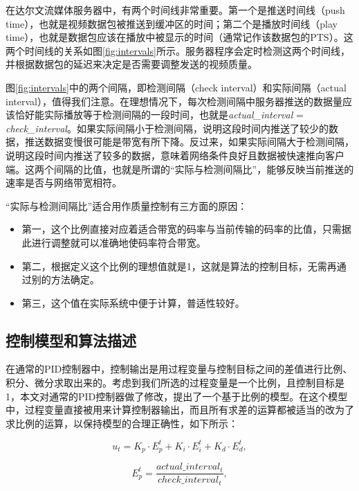 在达尔文流媒体服务器中，有两个时间线非常重要。第一个是推送时间线（push time），也就是视频数据包被推送到缓冲区的时间；第二个是播放时间线（play time），也就是数据包应该在播放中被显示的时间（通常记作该数据包的PTS）。这两个时间线的关系如图\ref{fig:intervals}所示。服务器程序会定时检测这两个时间线，并根据数据包的延迟来决定是否需要调整发送的视频质量。

图\ref{fig:intervals}中的两个间隔，即检测间隔（check interval）和实际间隔（actual interval），值得我们注意。在理想情况下，每次检测间隔中服务器推送的数据量应该恰好能实际播放等于检测间隔的一段时间，也就是\textit{actual\_interval} = \textit{check\_interval}。如果实际间隔小于检测间隔，说明这段时间内推送了较少的数据，推送数据变慢很可能是带宽有所下降。反过来，如果实际间隔大于检测间隔，说明这段时间内推送了较多的数据，意味着网络条件良好且数据被快速推向客户端。这两个间隔的比值，也就是所谓的“实际与检测间隔比”，能够反映当前推送的速率是否与网络带宽相符。

“实际与检测间隔比”适合用作质量控制有三方面的原因：
\begin{itemize}
	\item 第一，这个比例直接对应着适合带宽的码率与当前传输的码率的比值，只需据此进行调整就可以准确地使码率符合带宽。
	\item 第二，根据定义这个比例的理想值就是1，这就是算法的控制目标，无需再通过别的方法确定。
	\item 第三，这个值在实际系统中便于计算，普适性较好。
\end{itemize}

\subsection{控制模型和算法描述}

在通常的PID控制器中，控制输出是用过程变量与控制目标之间的差值进行比例、积分、微分求取出来的。考虑到我们所选的过程变量是一个比例，且控制目标是1，本文对通常的PID控制器做了修改，提出了一个基于比例的模型。在这个模型中，过程变量直接被用来计算控制器输出，而且所有求差的运算都被适当的改为了求比例的运算，以保持模型的合理正确性，如下所示：

\begin{equation}
\label{eq:ut}
{u_t} = {K_p} \cdot E_p^t + {K_i} \cdot E_i^t + {K_d} \cdot E_d^t ,
\end{equation}

\begin{equation}
\label{eq:ep}
E_p^t = \frac{{actual\_interva{l_t}}}{{check\_interva{l_t}}} ,
\end{equation}

